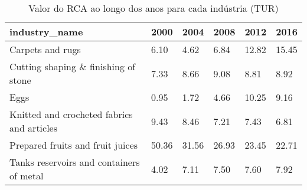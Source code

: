 \begin{table}
\centering
\caption{Valor do RCA ao longo dos anos para cada indústria (TUR)}
\begin{tabular}{p{6cm}p{1.5cm}p{1.5cm}p{1.5cm}p{1.5cm}p{1.5cm}}
\toprule
                             industry\_name &  2000 &  2004 &  2008 &  2012 &  2016 \\
\midrule
                          Carpets and rugs &  6.10 &  4.62 &  6.84 & 12.82 & 15.45 \\
      Cutting shaping \& finishing of stone &  7.33 &  8.66 &  9.08 &  8.81 &  8.92 \\
                                      Eggs &  0.95 &  1.72 &  4.66 & 10.25 &  9.16 \\
Knitted and crocheted fabrics and articles &  9.43 &  8.46 &  7.21 &  7.43 &  6.81 \\
          Prepared fruits and fruit juices & 50.36 & 31.56 & 26.93 & 23.45 & 22.71 \\
  Tanks reservoirs and containers of metal &  4.02 &  7.11 &  7.50 &  7.60 &  7.92 \\
\bottomrule
\end{tabular}
\end{table}
